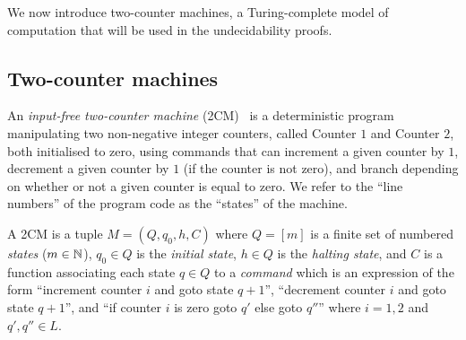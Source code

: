 %



We now introduce two-counter machines, a Turing-complete model of computation that will be used in the undecidability proofs.




\subsection{Two-counter machines}
An \emph{input-free two-counter machine} (2CM)~\cite{Minsky67} is a deterministic program manipulating two non-negative integer counters, called Counter $1$ and Counter $2$, both initialised to zero, using commands that can increment a given counter by $1$, decrement a given counter by $1$ (if the counter is not zero), and branch depending on whether or not a given counter is equal to zero. We refer to the ``line numbers'' of the program code as the ``states'' of the machine.

\begin{definition}[2CM]
A 2CM is a tuple $M = (Q,q_0,h,C)$ where $Q = [m]$ is a finite set of numbered \emph{states} ($m \in \mathbb{N}$), $q_0 \in Q$ is the \emph{initial state}, 
$h \in Q$ is the \emph{halting state}, and
$C$ is a function associating each state $q \in Q$ to a \emph{command} which is an expression of the form ``increment counter $i$ and goto state $q+1$'', ``decrement counter $i$ and goto state $q+1$'', and ``if counter $i$ is zero goto $q'$ else goto $q''$'' where $i = 1,2$ and $q',q'' \in L$.
\end{definition}

